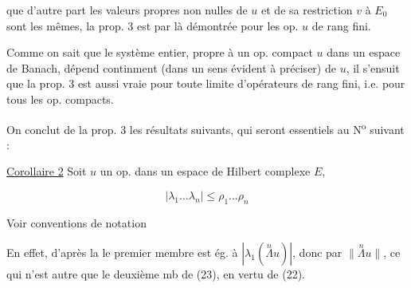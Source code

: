 que d'autre part les valeurs propres non nulles de $u$ et de sa restriction $v$ à $E_0$ sont les mêmes, la prop. 3 est par là démontrée pour les op. $u$ de rang fini.

Comme on sait que le système  entier, propre à un op. compact $u$ dans un espace de Banach, dépend  continment  (dans un sens évident à préciser) de $u$, il s'ensuit que la prop. 3 est aussi vraie pour toute limite d'opérateurs de rang fini, i.e. pour tous les op. compacts.

On conclut de la prop. 3 les résultats suivants, qui seront essentiels au N\textsuperscript{o} suivant : 

\uline{Corollaire 2} Soit $u$ un op.  dans un espace de Hilbert complexe $E$,  

\[
|\lambda_1\ldots\lambda_n|\leq\rho_1\ldots\rho_n\tag*{(23)}
\]


Voir conventions de notation  

En effet, d'après la   le premier membre est ég. à  $|\lambda_1(\overset{n}{\Lambda}u)|$, donc  par $\lVert\overset{n}{\Lambda}u\rVert$,  ce qui n'est autre que le deuxième mb de (23), en vertu de (22).


